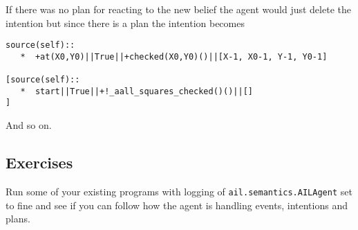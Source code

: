 If there was no plan for reacting to the new belief the agent would just delete the intention but since there is a plan the intention becomes
\begin{verbatim}
source(self):: 
   *  +at(X0,Y0)||True||+checked(X0,Y0)()||[X-1, X0-1, Y-1, Y0-1]

[source(self):: 
   *  start||True||+!_aall_squares_checked()()||[]
] 
\end{verbatim}
And so on.

\subsection{Exercises}
Run some of your existing programs with logging of \texttt{ail.semantics.AILAgent} set to fine and see if you can follow how the agent is handling events, intentions and plans.

